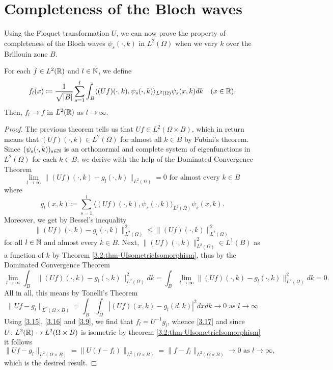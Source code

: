 \section{Completeness of the Bloch waves}

Using the Floquet transformation $U$, we can now prove the property of completeness of the Bloch waves $\psi_{s}(\cdot, k)$ in $L^{2}(\Omega)$ when we vary $k$ over the Brillouin zone $B$.
	
\begin{theorem} \label{3.3:thm-flConvergence}
		For each $f \in L^{2}(\mathbb{R})$ and $l \in \mathbb{N}$, we define
			\begin{equation}
				f_{l}(x) \coloneqq \frac{1}{\sqrt{|B|}} \sum_{s=1}^{l} \int_{B} \langle (Uf)(\cdot, k), \psi_{s}(\cdot, k) \rangle_{L^{2}(\Omega)} \psi_{s}(x, k) dk \quad (x \in \mathbb{R}). \label{3.15}
			\end{equation}
		Then, $f_{l} \rightarrow f$ in $L^{2}(\mathbb{R})$ as $l \rightarrow \infty$.

	\begin{proof}
		The previous theorem tells us that $Uf \in L^{2}(\Omega \times B)$, which in return means that $(Uf)(\cdot, k) \in L^{2}(\Omega)$ for almost all $k \in B$ by Fubini's theorem. Since $(\psi_{s}(\cdot, k))_{s \in \mathbb{N}}$ is an orthonormal and complete system of eigenfunctions in $L^{2}(\Omega)$ for each $k \in B$, we derive with the help of the Dominated Convergence Theorem
			\[ \lim_{l \rightarrow \infty} \| (Uf)(\cdot, k) - g_{l}(\cdot, k) \|_{L^{2}(\Omega)} = 0 \text{ for almost every } k \in B \]
		where 
			\begin{equation}
				g_{l}(x, k) \coloneqq \sum_{s=1}^{l} \langle(Uf)(\cdot, k), \psi_{s}(\cdot,k)\rangle_{L^{2}(\Omega)} \psi_{s}(x,k). \label{3.16}
			\end{equation}
		Moreover, we get by Bessel's inequality
			\[ \| (Uf)(\cdot, k) - g_{l}(\cdot, k) \|^{2}_{L^{2}(\Omega)} \leq \| (Uf)(\cdot, k) \|^{2}_{L^{2}(\Omega)}  \]
		for all $l \in \mathbb{N}$ and almost every $k \in B$. Next, $\|(Uf)(\cdot, k)\|^{2}_{L^{2}(\Omega)} \in L^{1}(B)$ as a function of $k$ by Theorem \ref{3.2:thm-UIsometricIsomorphism}, thus by the Dominated Convergence Theorem
		\[ \lim_{l \rightarrow \infty} \int_{B} \| (Uf)(\cdot, k) - g_{l}(\cdot, k) \|^{2}_{L^{2}(\Omega)} dk  = \int_{B} \lim_{l \rightarrow \infty}  \| (Uf)(\cdot, k) - g_{l}(\cdot, k) \|^{2}_{L^{2}(\Omega)} dk = 0. \]
		  All in all, this means by Tonelli's Theorem
			\begin{equation}
				\| U f - g_{l} \|_{L^{2}(\Omega \times B)} = \int_{B} \int_{\Omega} \left| (Uf)(x, k) - g_{l}(d, k) \right|^{2} dx dk \rightarrow 0 \text{ as } l \rightarrow \infty \label{3.17}
			\end{equation} 
		 Using \eqref{3.15}, \eqref{3.16} and \eqref{3.9}, we find that $f_{l} = U^{-1}g_{l}$, whence \eqref{3.17} and since $U \colon L^{2}(\mathbb{R}) \rightarrow L^{2}(\Omega \times B)$ is isometric by theorem \ref{3.2:thm-UIsometricIsomorphism} it follows
			\[ \| U f - g_{l} \|_{L^{2}(\Omega \times B)} = \| U(f - f_{l}) \|_{L^{2}(\Omega \times B)} = \| f - f_{l} \|_{L^{2}(\Omega \times B)} \rightarrow 0 \text{ as } l \rightarrow \infty,\]
		 which is the desired result.
	\end{proof}
\end{theorem}
